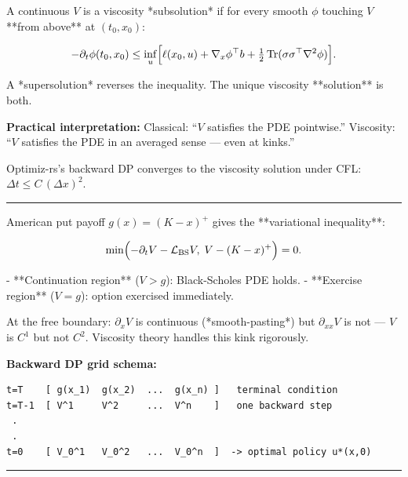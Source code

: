 \documentclass[11pt,a4paper]{article}
\begin{document}
\begin{tcolorbox}[colback=defbg!60,colframe=optblue,fonttitle=\bfseries\sffamily,title={\textsf{\textbf{Definition}} — Definition — Viscosity Subsolution},breakable]
A continuous $V$ is a viscosity *subsolution* if for every smooth $\phi$
touching $V$ **from above** at $(t_0,x_0)$:

$$-\partial_t\phi(t_0,x_0) \le \inf_u\Bigl[\ell(x_0,u) + \nabla_x\phi^\top b + \tfrac12\operatorname{Tr}(\sigma\sigma^\top\nabla^2\phi)\Bigr].$$

A *supersolution* reverses the inequality. The unique viscosity **solution** is both.
\end{tcolorbox}

\textbf{Practical interpretation:} Classical: ``\(V\) satisfies the PDE pointwise.'' Viscosity: ``\(V\) satisfies the PDE in an averaged sense --- even at kinks.''

Optimiz-rs's backward DP converges to the viscosity solution under CFL: \(\Delta t \le C\,(\Delta x)^2\).

\begin{center}\rule{0.5\linewidth}{0.5pt}\end{center}

\begin{tcolorbox}[colback=notebg!60,colframe=optgreen,fonttitle=\bfseries\sffamily,title={\textsf{\textbf{Example}} — Example — American Option as a Viscosity Problem},breakable]
American put payoff $g(x) = (K-x)^+$ gives the **variational inequality**:

$$\min\Bigl(-\partial_t V - \mathcal{L}_{\text{BS}}V,\; V - (K-x)^+\Bigr) = 0.$$

- **Continuation region** ($V > g$): Black-Scholes PDE holds.
- **Exercise region** ($V = g$): option exercised immediately.

At the free boundary: $\partial_x V$ is continuous (*smooth-pasting*) but $\partial_{xx}V$ is not
— $V$ is $C^1$ but not $C^2$. Viscosity theory handles this kink rigorously.
\end{tcolorbox}

\textbf{Backward DP grid schema:}

\begin{verbatim}
t=T    [ g(x_1)  g(x_2)  ...  g(x_n) ]   terminal condition
t=T-1  [ V^1     V^2     ...  V^n    ]   one backward step
 .
 .
t=0    [ V_0^1   V_0^2   ...  V_0^n  ]  -> optimal policy u*(x,0)
\end{verbatim}

\begin{center}\rule{0.5\linewidth}{0.5pt}\end{center}
\end{document}
